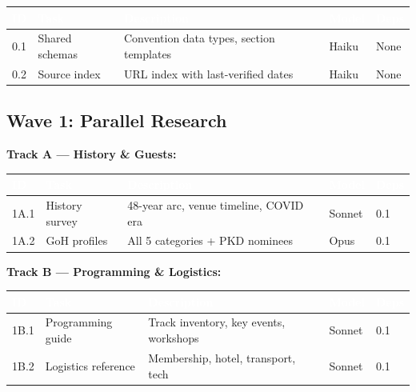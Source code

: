 \documentclass[11pt,letterpaper]{article}
\newcommand{\tableheader}[1]{\textbf{\sffamily\textcolor{white}{#1}}}
\begin{document}
\begin{center}
\begin{tabularx}{\textwidth}{C{0.8cm}L{3.5cm}XC{1.5cm}C{1.5cm}}
\toprule
{}
\tableheader{ID} & \tableheader{Task} & \tableheader{Description} & \tableheader{Model} & \tableheader{Deps} \\
 & Shared schemas & Convention data types, section templates & Haiku & None \\
0.2 & Source index & URL index with last-verified dates & Haiku & None \\
\bottomrule
\end{tabularx}
\end{center}

\subsection{Wave 1: Parallel Research}

\textbf{Track A --- History \& Guests:}

\begin{center}
\begin{tabularx}{\textwidth}{C{0.8cm}L{3cm}XC{1.5cm}C{1.5cm}}
\toprule
{}
\tableheader{ID} & \tableheader{Task} & \tableheader{Description} & \tableheader{Model} & \tableheader{Deps} \\
\midrule
1A.1 & History survey & 48-year arc, venue timeline, COVID era & Sonnet & 0.1 \\
1A.2 & GoH profiles & All 5 categories + PKD nominees & Opus & 0.1 \\
\bottomrule
\end{tabularx}
\end{center}

\textbf{Track B --- Programming \& Logistics:}

\begin{center}
\begin{tabularx}{\textwidth}{C{0.8cm}L{3cm}XC{1.5cm}C{1.5cm}}
\toprule
{}
\tableheader{ID} & \tableheader{Task} & \tableheader{Description} & \tableheader{Model} & \tableheader{Deps} \\
\midrule
1B.1 & Programming guide & Track inventory, key events, workshops & Sonnet & 0.1 \\
1B.2 & Logistics reference & Membership, hotel, transport, tech & Sonnet & 0.1 \\
\bottomrule
\end{tabularx}
\end{center}
\end{document}
